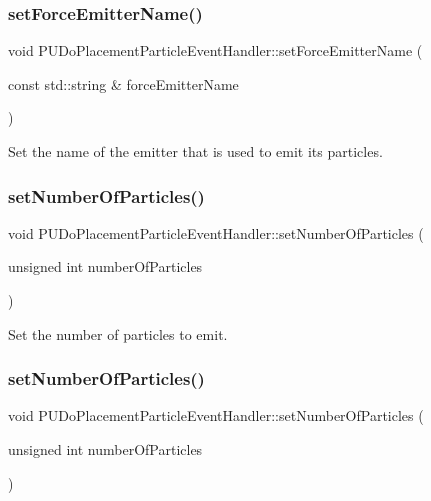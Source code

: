 \subsubsection{\texorpdfstring{set\+Force\+Emitter\+Name()}{setForceEmitterName()}\hspace{0.1cm}{\footnotesize\ttfamily [2/2]}}
{\footnotesize\ttfamily void P\+U\+Do\+Placement\+Particle\+Event\+Handler\+::set\+Force\+Emitter\+Name (\begin{DoxyParamCaption}\item[{const std\+::string \&}]{force\+Emitter\+Name }\end{DoxyParamCaption})}

Set the name of the emitter that is used to emit its particles. \mbox{\label{classPUDoPlacementParticleEventHandler_a22b2de04e22c880c32049f2b32838369}} 
\subsubsection{\texorpdfstring{set\+Number\+Of\+Particles()}{setNumberOfParticles()}\hspace{0.1cm}{\footnotesize\ttfamily [1/2]}}
{\footnotesize\ttfamily void P\+U\+Do\+Placement\+Particle\+Event\+Handler\+::set\+Number\+Of\+Particles (\begin{DoxyParamCaption}\item[{unsigned int}]{number\+Of\+Particles }\end{DoxyParamCaption})\hspace{0.3cm}{\ttfamily [inline]}}

Set the number of particles to emit. \mbox{\label{classPUDoPlacementParticleEventHandler_a22b2de04e22c880c32049f2b32838369}} 
\subsubsection{\texorpdfstring{set\+Number\+Of\+Particles()}{setNumberOfParticles()}\hspace{0.1cm}{\footnotesize\ttfamily [2/2]}}
{\footnotesize\ttfamily void P\+U\+Do\+Placement\+Particle\+Event\+Handler\+::set\+Number\+Of\+Particles (\begin{DoxyParamCaption}\item[{unsigned int}]{number\+Of\+Particles }\end{DoxyParamCaption})\hspace{0.3cm}{\ttfamily [inline]}}

